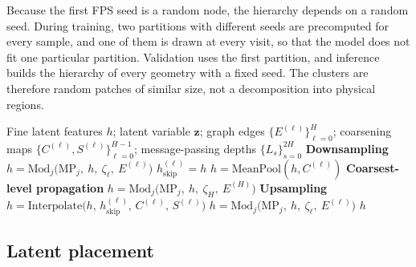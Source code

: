 \documentclass[preprint,12pt]{elsarticle}
\newcommand{\bz}{\mathbf{z}}
\begin{document}
Because the first FPS seed is a random node, the hierarchy depends on a random seed. During
training, two partitions with different seeds are precomputed for every sample, and one of them
is drawn at every visit, so that the model does not fit one particular partition. Validation uses
the first partition, and inference builds the hierarchy of every geometry with a fixed seed. The
clusters are therefore random patches of similar size, not a decomposition into physical regions.

\begin{algorithm}[!htbp]
\caption{Hierarchical message-passing processor of HI-MGN-V with latent modulation.}
\label{alg:vcycle}
\begin{algorithmic}[1]
\Require Fine latent features $h$; latent variable $\bz$; graph edges $\{E^{(\ell)}\}_{\ell=0}^{H}$;
         coarsening maps $\{C^{(\ell)}, S^{(\ell)}\}_{\ell=0}^{H-1}$;
         message-passing depths $\{L_s\}_{s=0}^{2H}$
\Statex \textbf{Downsampling}
        \State $h = \mathrm{Mod}_j\bigl(\mathrm{MP}_j,\ h,\ \zeta_\ell,\ E^{(\ell)}\bigr)$ 
    \EndFor
    \State $h_{\mathrm{skip}}^{(\ell)} = h$
    \State $h = \mathrm{MeanPool}(h, C^{(\ell)})$
\EndFor
\Statex \textbf{Coarsest-level propagation}
    \State $h = \mathrm{Mod}_j\bigl(\mathrm{MP}_j,\ h,\ \zeta_H,\ E^{(H)}\bigr)$
\EndFor
\Statex \textbf{Upsampling}
    \State $h = \mathrm{Interpolate}\bigl(h,\, h_{\mathrm{skip}}^{(\ell)},\, C^{(\ell)},\, S^{(\ell)}\bigr)$ 
        \State $h = \mathrm{Mod}_j\bigl(\mathrm{MP}_j,\ h,\ \zeta_\ell,\ E^{(\ell)}\bigr)$
    \EndFor
\EndFor
\State \Return $h$
\end{algorithmic}
\end{algorithm}

\subsection{Latent placement}\label{sec:placement}
\end{document}

